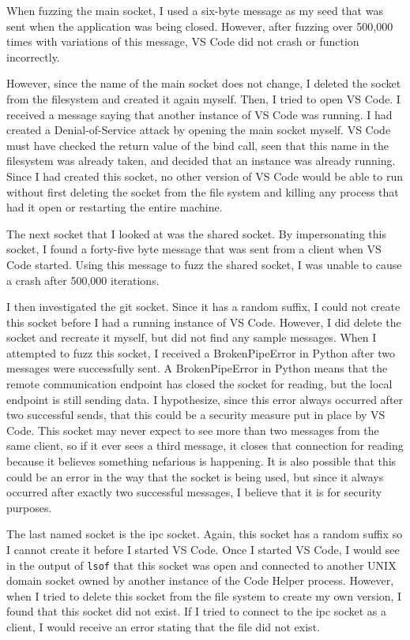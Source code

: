 When fuzzing the main socket, I used a six-byte message as my seed that was sent when the application was being closed.  However, after fuzzing over 500,000 times with variations of this message, VS Code did not crash or function incorrectly.

However, since the name of the main socket does not change, I deleted the socket from the filesystem and created it again myself.  Then, I tried to open VS Code.  I received a message saying that another instance of VS Code was running.  I had created a Denial-of-Service attack by opening the main socket myself.  VS Code must have checked the return value of the bind call, seen that this name in the filesystem was already taken, and decided that an instance was already running.  Since I had created this socket, no other version of VS Code would be able to run without first deleting the socket from the file system and killing any process that had it open or restarting the entire machine.

The next socket that I looked at was the shared socket.  By impersonating this socket, I found a forty-five byte message that was sent from a client when VS Code started.  Using this message to fuzz the shared socket, I was unable to cause a crash after 500,000 iterations.

I then investigated the git socket.  Since it has a random suffix, I could not create this socket before I had a running instance of VS Code.  However, I did delete the socket and recreate it myself, but did not find any sample messages.  When I attempted to fuzz this socket, I received a BrokenPipeError in Python after two messages were successfully sent.  A BrokenPipeError in Python means that the remote communication endpoint has closed the socket for reading, but the local endpoint is still sending data.  I hypothesize, since this error always occurred after two successful sends, that this could be a security measure put in place by VS Code.  This socket may never expect to see more than two messages from the same client, so if it ever sees a third message, it closes that connection for reading because it believes something nefarious is happening.  It is also possible that this could be an error in the way that the socket is being used, but since it always occurred after exactly two successful messages, I believe that it is for security purposes.

The last named socket is the ipc socket.  Again, this socket has a random suffix so I cannot create it before I started VS Code.  Once I started VS Code, I would see in the output of \texttt{lsof} that this socket was open and connected to another UNIX domain socket owned by another instance of the Code Helper process.  However, when I tried to delete this socket from the file system to create my own version, I found that this socket did not exist.  If I tried to connect to the ipc socket as a client, I would receive an error stating that the file did not exist.

